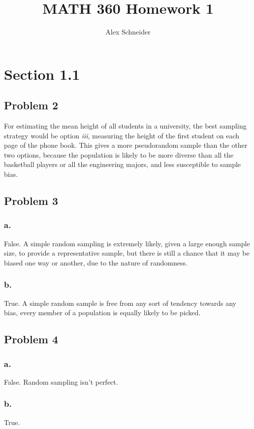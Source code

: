 \documentclass[11pt]{article}
\title{MATH 360 Homework 1}
\author{Alex Schneider}
\begin{document}
\maketitle
\section*{Section 1.1}
\subsection*{Problem 2}
For estimating the mean height of all students in a university, the best
sampling strategy would be option \textit{iii}, measuring the height of the first
student on each page of the phone book. This gives a more pseudorandom sample
than the other two options, because the population is likely to be more diverse
than all the basketball players or all the engineering majors, and less
susceptible to sample bias. 

\subsection*{Problem 3}
\subsubsection*{a.}
False. A simple random sampling is extremely likely, given a large enough sample
size, to provide a representative sample, but there is still a chance that it
may be biased one way or another, due to the nature of randomness. 

\subsubsection*{b.}
True. A simple random sample is free from any sort of tendency towards any bias,
every member of a population is equally likely to be picked.

\subsection*{Problem 4}
\subsubsection*{a.}
False. Random sampling isn't perfect.

\subsubsection*{b.}
True.
\end{document}
